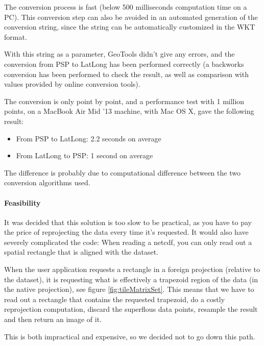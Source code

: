 \documentclass[11pt,a4paper,titlepage,oneside]{report}
\begin{document}
The conversion process is fast (below 500 milliseconds computation time on a PC). This conversion step can also be avoided in an automated generation of the conversion string, since the string can be automatically customized in the \gls{WKT} format.

With this string as a parameter, GeoTools didn't give any errors, and the conversion from PSP to LatLong has been performed correctly (a backworks conversion has been performed to check the result, as well as comparison with values provided by online conversion tools).

The conversion is only point by point, and a performance test with 1 million points, on a MacBook Air Mid '13 machine, with Mac OS X, gave the following result:
\begin{itemize}
\item From PSP to LatLong: 2.2 seconds on average
\item From LatLong to PSP: 1 second on average
\end{itemize}

The difference is probably due to computational difference between the two conversion algorithms used.

\paragraph{Feasibility}
It was decided that this solution is too slow to be practical, as you have to pay the price of reprojecting the data every time it's requested. It would also have severely complicated the code: When reading a \gls{netcdf}, you can only read out a spatial rectangle that is aligned with the dataset.

When the user application requests a rectangle in a foreign projection (relative to the dataset), it is requesting what is effectively a trapezoid region of the data (in the native projection), see figure \ref{fig:tileMatrixSet}. This means that we have to read out a rectangle that contains the requested trapezoid, do a costly reprojection computation, discard the superflous data points, resample the result and then return an image of it.

This is both impractical and expensive, so we decided not to go down this path.
\end{document}
